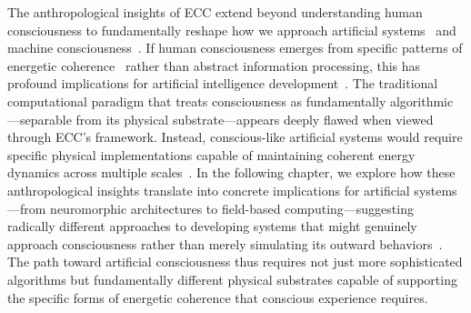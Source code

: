 The anthropological insights of ECC extend beyond understanding human consciousness to fundamentally reshape how we approach artificial systems~ and machine consciousness~\cite{hayles2012how, rabinow2008marking}. If human consciousness emerges from specific patterns of energetic coherence~ rather than abstract information processing, this has profound implications for artificial intelligence development~\cite{ingold2013making, fischer2018anthropology}. The traditional computational paradigm that treats consciousness as fundamentally algorithmic---separable from its physical substrate---appears deeply flawed when viewed through ECC's framework. Instead, conscious-like artificial systems would require specific physical implementations capable of maintaining coherent energy dynamics across multiple scales~\cite{latour2005reassembling, strathern2004partial}. In the following chapter, we explore how these anthropological insights translate into concrete implications for artificial systems---from neuromorphic architectures to field-based computing---suggesting radically different approaches to developing systems that might genuinely approach consciousness rather than merely simulating its outward behaviors~\cite{hayles2012how, latour1993modern}. The path toward artificial consciousness thus requires not just more sophisticated algorithms but fundamentally different physical substrates capable of supporting the specific forms of energetic coherence that conscious experience requires.
